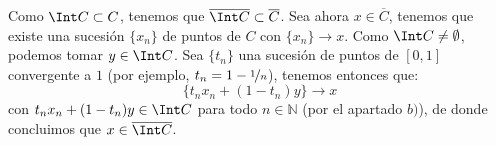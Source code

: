 \begin{ejercicio}
\begin{enumerate}[label=\alph*)]
            Como $\Int C\subset C$, tenemos que $\overline{\Int C}\subset \overline{C}$. Sea ahora $x\in \overline{C}$, tenemos que existe una sucesión $\{x_n\}$ de puntos de $C$ con $\{x_n\}\to x$. Como $\Int C \neq \emptyset $, podemos tomar $y\in \Int C$. Sea $\{t_n\}$ una sucesión de puntos de $[0,1]$ convergente a $1$ (por ejemplo, $t_n = 1-\nicefrac{1}{n}$), tenemos entonces que:
            \begin{equation*}
                \{t_n x_n + (1-t_n)y\} \to x
            \end{equation*}
            con $t_nx_n + (1-t_n)y\in \Int C$ para todo $n\in \mathbb{N}$ (por el apartado $b)$), de donde concluimos que $x\in \overline{\Int C}$.
    \end{enumerate}
\end{ejercicio}

